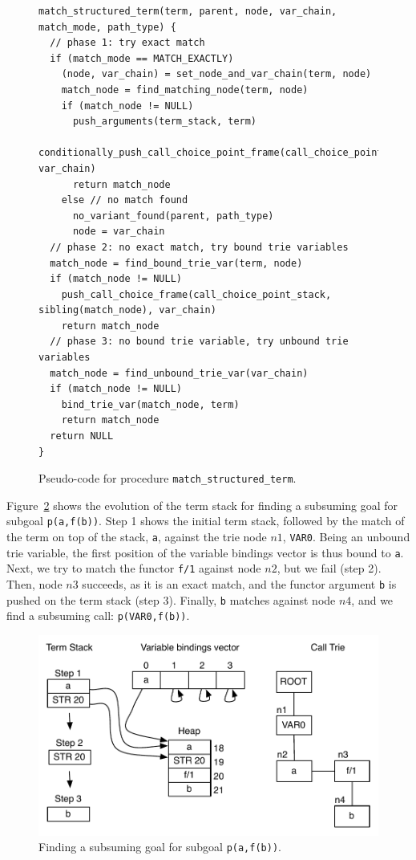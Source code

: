 \begin{figure}[ht]
\begin{Verbatim}
match_structured_term(term, parent, node, var_chain, match_mode, path_type) {
  // phase 1: try exact match
  if (match_mode == MATCH_EXACTLY)
    (node, var_chain) = set_node_and_var_chain(term, node)
    match_node = find_matching_node(term, node)
    if (match_node != NULL)
      push_arguments(term_stack, term)
      conditionally_push_call_choice_point_frame(call_choice_point_stack, var_chain)
      return match_node
    else // no match found
      no_variant_found(parent, path_type)
      node = var_chain
  // phase 2: no exact match, try bound trie variables
  match_node = find_bound_trie_var(term, node)
  if (match_node != NULL)
    push_call_choice_frame(call_choice_point_stack, sibling(match_node), var_chain)
    return match_node
  // phase 3: no bound trie variable, try unbound trie variables
  match_node = find_unbound_trie_var(var_chain)
  if (match_node != NULL)
    bind_trie_var(match_node, term)
    return match_node
  return NULL
}
\end{Verbatim}
\caption{Pseudo-code for procedure \texttt{match\_structured\_term}.}
\label{fig:match_structured_term}
\end{figure}

Figure~\ref{fig:match_functor} shows the evolution of the term stack for finding
a subsuming goal for subgoal \texttt{p(a,f(b))}. Step 1 shows the initial
term stack, followed by the match of the term on top of the stack, \texttt{a},
against the trie node $n1$, \texttt{VAR0}.
Being an unbound trie variable, the first position of the variable bindings
vector is thus bound to \texttt{a}.
Next, we try to match the functor \texttt{f/1} against node $n2$, but we fail (step 2).
Then, node $n3$ succeeds, as it is an exact match, and the functor argument \texttt{b} is pushed on
the term stack (step 3). Finally, \texttt{b} matches against node $n4$, and we find
a subsuming call: \texttt{p(VAR0,f(b))}.

\begin{figure}[ht]
  \centering
    \includegraphics[scale=0.65]{match_functor.pdf}
  \caption{Finding a subsuming goal for subgoal \texttt{p(a,f(b))}.}
  \label{fig:match_functor}
\end{figure}

